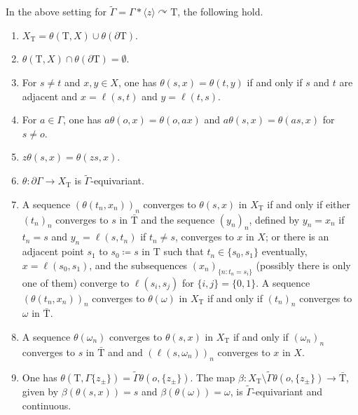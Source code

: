 \documentclass[10pt,a4paper]{amsart}
\newcommand{\Ga}{\Gamma}
\newcommand{\Tree}{\mathrm{T}}
\newcommand{\acts}{\curvearrowright}
\newcommand{\ip}[1]{\mathopen{\langle}#1\mathclose{\rangle}}
\begin{document}
\begin{thm}\label{thm:space}
In the above setting for $\tilde{\Ga}=\Ga*\ip{z}\acts\Tree$, the following hold.
\begin{enumerate}
\item\label{p1}
$X_\Tree = \theta(\Tree,X) \cup \theta(\partial\Tree)$.
\item\label{p2}
$\theta(\Tree,X) \cap \theta(\partial\Tree) = \emptyset$.
\item\label{p3}
For $s\neq t$ and $x,y\in X$, 
one has $\theta(s,x)=\theta(t,y)$ if and only if 
$s$ and $t$ are adjacent and $x=\ell(s,t)$ and $y=\ell(t,s)$. 
\item\label{p4}
For $a\in\Ga$, one has 
$a\theta(o,x)=\theta(o,ax)$ and $a\theta(s,x)=\theta(as,x)$ 
for $s\neq o$.
\item\label{p5}
$z\theta(s,x)=\theta(zs,x)$. 
\item\label{p6}
$\theta\colon \partial\Ga\to X_\Tree$ is $\tilde{\Ga}$-equivariant.
\item\label{p7}
A sequence $(\theta(t_n,x_n))_n$ 
converges to $\theta(s,x)$ in $X_\Tree$ if and only if 
either 
$(t_n)_n$ converges to $s$ in $\bar{\Tree}$ and 
the sequence $(y_n)_n$, defined by 
$y_n= x_n$ if $t_n=s$ and $y_n = \ell(s,t_n)$ if $t_n\neq s$,
converges to $x$ in $X$; 
or there is an adjacent point $s_1$ to $s_0 \coloneq s$ in $\Tree$ 
such that $t_n\in\{s_0,s_1\}$ eventually, $x=\ell(s_0,s_1)$, 
and the subsequences $(x_n)_{\{n : t_n=s_i\}}$ 
(possibly there is only one of them) converge 
to $\ell(s_i,s_j)$ for $\{i,j\}=\{0,1\}$.  
A sequence $(\theta(t_n,x_n))_n$ 
converges to $\theta(\omega)$ in $X_\Tree$ if and only if 
$(t_n)_n$ converges to $\omega$ in $\bar{\Tree}$.
\item\label{p8}
A sequence $\theta(\omega_n)$ 
converges to $\theta(s,x)$ in $X_\Tree$ if and only if 
$(\omega_n)_n$ converges to $s$ in $\bar{\Tree}$ and 
and $(\ell(s,\omega_n))_n$ converges to $x$ in $X$.
\item\label{p9}
One has 
$\theta(\Tree,\Ga\{z_\pm\})=\tilde{\Ga}\theta(o,\{z_\pm\})$. 
The map 
$\beta\colon X_\Tree \setminus \tilde{\Ga}\theta(o,\{z_\pm\}) 
\to\bar{\Tree}$, given by $\beta(\theta(s,x))=s$ and $\beta(\theta(\omega))=\omega$, is 
$\tilde{\Ga}$-equivariant and continuous. 
\end{enumerate}
\end{thm}
\end{document}
